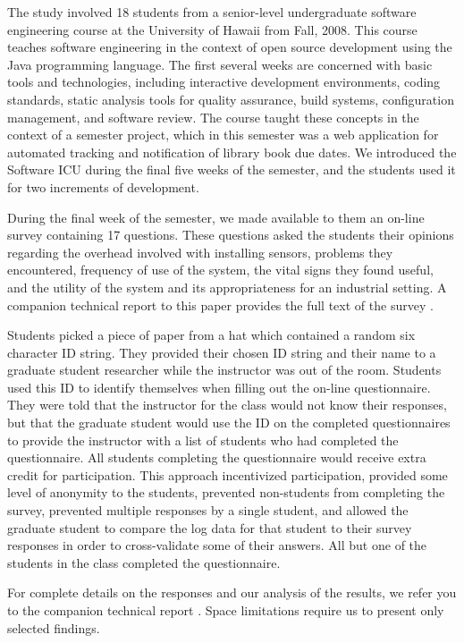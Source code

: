 \documentclass{acm_proc_article-sp}
\begin{document}
The study involved 18 students from a senior-level undergraduate software
engineering course at the University of Hawaii from Fall, 2008. This course
teaches software engineering in the context of open source development
using the Java programming language.  The first several weeks are concerned
with basic tools and technologies, including interactive development
environments, coding standards, static analysis tools for quality
assurance, build systems, configuration management, and software review.
The course taught these concepts in the context of a semester project,
which in this semester was a web application for automated tracking and
notification of library book due dates.  We introduced the Software ICU
during the final five weeks of the semester, and the students used it for
two increments of development.

During the final week of the semester, we made available to them an on-line
survey containing 17 questions.  These questions asked the students their
opinions regarding the overhead involved with installing sensors, problems
they encountered, frequency of use of the system, the vital signs they
found useful, and the utility of the system and its appropriateness for an
industrial setting.  A companion technical report to this paper provides
the full text of the survey \cite{csdl2-09-03}.

Students picked a piece of paper from a hat which contained a random six
character ID string.  They provided their chosen ID string and their name
to a graduate student researcher while the instructor was out of the room.
Students used this ID to identify themselves when filling out the on-line
questionnaire.  They were told that the instructor for the class would not
know their responses, but that the graduate student would use the ID on the
completed questionnaires to provide the instructor with a list of students
who had completed the questionnaire.  All students completing the
questionnaire would receive extra credit for participation.  This approach
incentivized participation, provided some level of anonymity to the
students, prevented non-students from completing the survey, prevented
multiple responses by a single student, and allowed the graduate student to
compare the log data for that student to their survey responses in order to
cross-validate some of their answers. All but one of the students in the
class completed the questionnaire.

For complete details on the responses and our analysis of the results, we 
refer you to the companion technical report \cite{csdl2-09-03}.  Space limitations 
require us to present only selected findings. 
\end{document}

